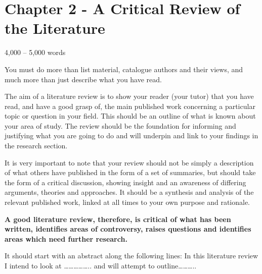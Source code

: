 \section{Chapter 2 - A Critical Review of the Literature}
4,000 – 5,000 words

You must do more than list material, catalogue authors and their views, and much more than just describe what you have read. 

The aim of a literature review is to show your reader (your tutor) that you have read, and have a good grasp of, the main published work concerning a particular topic or question in your field. This should be an outline of what is known about your area of study.  The review should be the foundation for informing and justifying what you are going to do and will underpin and link to your findings in the research section.

It is very important to note that your review should not be simply a description of what others have published in the form of a set of summaries, but should take the form of a critical discussion, showing insight and an awareness of differing arguments, theories and approaches. It should be a synthesis and analysis of the relevant published work, linked at all times to your own purpose and rationale.

\textbf{A good literature review, therefore, is critical of what has been written, identifies areas of controversy, raises questions and identifies areas which need further research. }

It should start with an abstract along the following lines:
In this literature review I intend to look at …………….. and will attempt to outline………..

